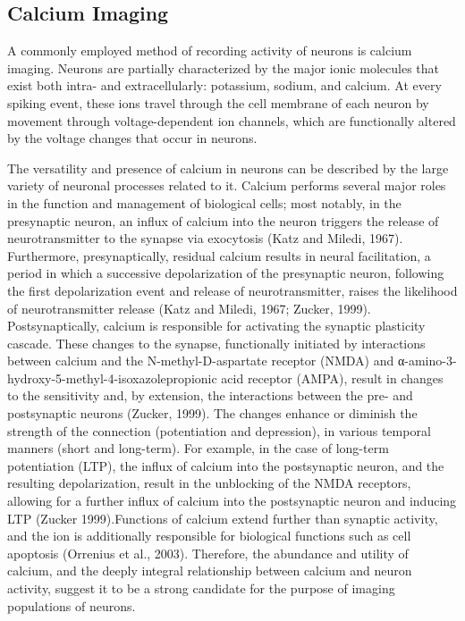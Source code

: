 \documentclass{article}
\begin{document}
\subsection{Calcium Imaging}
A commonly employed method of recording activity of neurons is calcium imaging. Neurons are partially characterized by the major ionic molecules that exist both intra- and extracellularly: potassium, sodium, and calcium. At every spiking event, these ions travel through the cell membrane of each neuron by movement through voltage-dependent ion channels, which are functionally altered by the voltage changes that occur in neurons.\par

The versatility and presence of calcium in neurons can be described by the large variety of neuronal processes related to it. Calcium performs several major roles in the function and management of biological cells; most notably, in the presynaptic neuron, an influx of calcium into the neuron triggers the release of neurotransmitter to the synapse via exocytosis (Katz and Miledi, 1967). Furthermore, presynaptically, residual calcium results in neural facilitation, a period in which a successive depolarization of the presynaptic neuron, following the first depolarization event and release of neurotransmitter, raises the likelihood of neurotransmitter release (Katz and Miledi, 1967; Zucker, 1999). Postsynaptically, calcium is responsible for activating the synaptic plasticity cascade. These changes to the synapse, functionally initiated by interactions between calcium and the N-methyl-D-aspartate receptor (NMDA) and α-amino-3-hydroxy-5-methyl-4-isoxazolepropionic acid receptor (AMPA), result in changes to the sensitivity and, by extension, the interactions between the pre- and postsynaptic neurons (Zucker, 1999). The changes enhance or diminish the strength of the connection (potentiation and depression), in various temporal manners (short and long-term). For example, in the case of long-term potentiation (LTP), the influx of calcium into the postsynaptic neuron, and the resulting depolarization, result in the unblocking of the NMDA receptors, allowing for a further influx of calcium into the postsynaptic neuron and inducing LTP (Zucker 1999).Functions of calcium extend further than synaptic activity, and the ion is additionally responsible for biological functions such as cell apoptosis (Orrenius et al., 2003). Therefore, the abundance and utility of calcium, and the deeply integral relationship between calcium and neuron activity, suggest it to be a strong candidate for the purpose of imaging populations of neurons.\par
\end{document}
